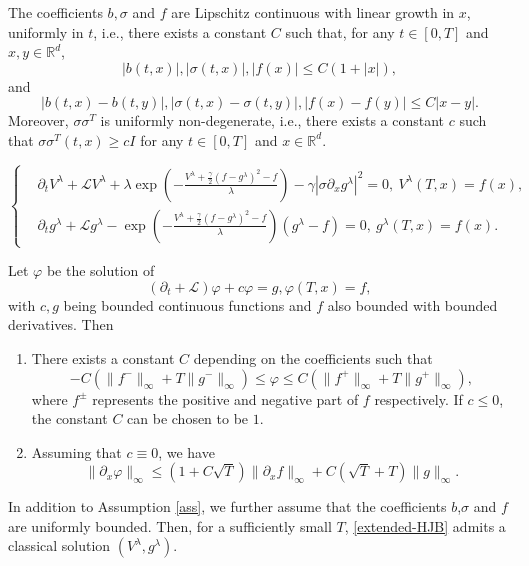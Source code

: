 \documentclass[10pt,a4paper]{amsart}
\begin{document}
\begin{assumption}\label{ass}
The coefficients $b,\sigma$ and $f$ are   Lipschitz continuous  with linear growth  in  $x$, uniformly in $t$, i.e., there exists a constant $C$ such that, for any $t\in [0,T]$ and $x,y \in \mathbb R^d$, 
$$
|b(t,x)|,|\sigma(t,x)|,|f(x)| \le C(1+|x|),
$$
and
$$
|b(t,x)-b(t,y)|,|\sigma(t,x)-\sigma(t,y)|,  |f(x)-f(y)| \le C|x-y|.
$$
Moreover, $\sigma\sigma^T$ is uniformly non-degenerate, i.e., there exists a constant $c$ such that $\sigma\sigma^T(t,x) \ge cI$ for any $t\in [0,T]$ and $x \in \mathbb R^d$.  

\end{assumption}

\begin{equation}\label{extended-HJB}
	\left\{
	\begin{split}
		&\partial_t V^\lambda+\mathcal LV^\lambda+\lambda\exp(-\frac{V^\lambda+\frac{\gamma}{2}(f-g^\lambda)^2-f}{\lambda})-\gamma |\sigma \partial_x g^\lambda|^2=0,\ V^\lambda(T,x)=f(x),\\
		& \partial_t g^\lambda+\mathcal L g^\lambda-\exp(-\frac{V^\lambda+\frac{\gamma}{2}(f-g^\lambda)^2-f}{\lambda})(g^\lambda-f)=0,\ g^\lambda(T,x)=f(x).
	\end{split}
	\right.
\end{equation}

\begin{lemma}\label{append_lemma}
Let $\varphi$ be the solution of 
$$
(\partial_t+\mathcal L)\varphi+c\varphi=g, \varphi(T,x)=f,
$$
with $c,g$ being bounded continuous functions and $f$ also bounded with bounded derivatives. Then
\begin{enumerate}
    \item There exists a constant $C$ depending on the coefficients such that 
    $$
    -C(\|f^-\|_\infty+T\|g^-\|_\infty)\le \varphi \le C(\|f^+\|_\infty+T\|g^+\|_\infty),
    $$
    where $f^{\pm}$ represents the positive and negative part of $f$ respectively. If $c\le 0$, the constant $C$ can be chosen to be $1$.
    \item Assuming that $c\equiv 0$, we have 
    $$
    \|\partial_x \varphi\|_\infty \le (1+C\sqrt{T})\|\partial_x f\|_\infty+C(\sqrt{T}+T)\|g\|_\infty.
    $$
\end{enumerate}
\end{lemma}

\begin{theorem} \label{thm3.2}
 In addition to Assumption \ref{ass}, we further assume that the coefficients $b$,$\sigma$ and $f$ are uniformly bounded.  Then, for a sufficiently small $T$, \eqref{extended-HJB} admits a classical solution $(V^\lambda,g^\lambda)$.
\end{theorem}
\end{document}

